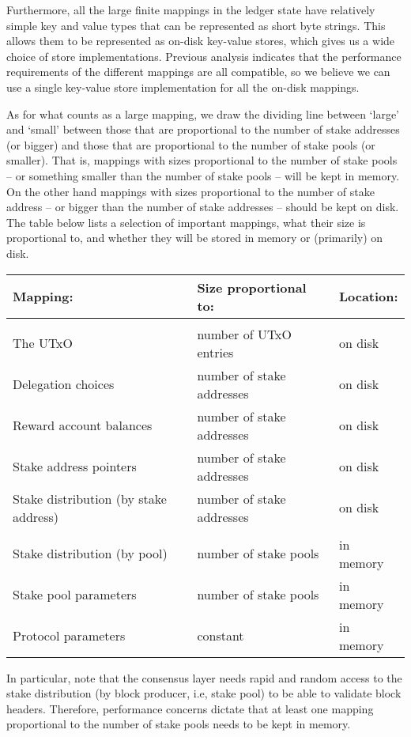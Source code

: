 \documentclass[11pt,a4paper]{article}
\begin{document}
Furthermore, all the large finite mappings in the ledger state have relatively
simple key and value types that can be represented as short byte strings. This
allows them to be represented as on-disk key-value stores, which gives us a
wide choice of store implementations. Previous analysis \citep[Section 5]{utxo-db}
indicates that the performance requirements of the different mappings are all
compatible, so we believe we can use a single key-value store implementation
for all the on-disk mappings.

As for what counts as a large mapping, we draw the dividing line between `large'
and `small' between those that are proportional to the number of stake addresses
(or bigger) and those that are proportional to the number of stake pools (or
smaller). That is, mappings with sizes proportional to the number of stake pools
-- or something smaller than the number of stake pools -- will be kept in
memory. On the other hand mappings with sizes proportional to the number of
stake address -- or bigger than the number of stake addresses -- should be kept
on disk. The table below lists a selection of important mappings, what their
size is proportional to, and whether they will be stored in memory or
(primarily) on disk.
\begin{center}
\begin{tabular}{lll}
Mapping: & Size proportional to: & Location: \\
\hline \hline \\
The UTxO                              & number of UTxO entries    & on disk \\
Delegation choices                    & number of stake addresses & on disk \\
Reward account balances               & number of stake addresses & on disk \\
Stake address pointers                & number of stake addresses & on disk \\
Stake distribution (by stake address) & number of stake addresses & on disk \\
\hline \\
Stake distribution (by pool)          & number of stake pools & in memory \\
Stake pool parameters                 & number of stake pools & in memory \\
Protocol parameters                   & constant              & in memory
\end{tabular}
\end{center}
In particular, note that the consensus layer needs rapid and random access to
the stake distribution (by block producer, i.e, stake pool) to be able to
validate block headers. Therefore, performance concerns dictate that at least
one mapping proportional to the number of stake pools needs to be kept in
memory.
\end{document}
